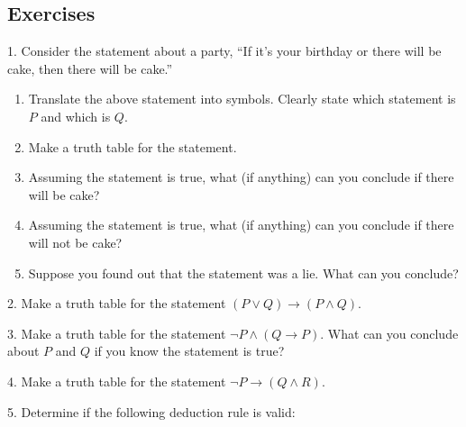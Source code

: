 \documentclass[10pt,]{book}
\theoremstyle{plain}
\theoremstyle{definition}
\theoremstyle{definition}
\theoremstyle{definition}
\numberwithin{equation}{chapter}
\def\imp{\rightarrow}
\begin{document}
\subsection[Exercises]{Exercises}\label{exercises-19}
\begin{exerciselist}
\item[1.]\hypertarget{exercise-220}{}
              Consider the statement about a party, ``If it's your birthday or there will be cake, then there will be cake.''
\leavevmode%
\begin{enumerate}[label=(\alph*)]
\item\hypertarget{li-1045}{}
                  Translate the above statement into symbols. Clearly state which statement is \(P\) and which is \(Q\).
\item\hypertarget{li-1046}{}
                  Make a truth table for the statement.
\item\hypertarget{li-1047}{}
                  Assuming the statement is true, what (if anything) can you conclude if there will be cake?
\item\hypertarget{li-1048}{}
                  Assuming the statement is true, what (if anything) can you conclude if there will not be cake?
\item\hypertarget{li-1049}{}
                  Suppose you found out that the statement was a lie. What can you conclude?
\end{enumerate}
\par\smallskip
\item[2.]\hypertarget{exercise-221}{}
              Make a truth table for the statement \((P \vee Q) \imp (P \wedge Q)\).
\par\smallskip
\item[3.]\hypertarget{exercise-222}{}
              Make a truth table for the statement \(\neg P \wedge (Q \imp P)\). What can you conclude about \(P\) and \(Q\) if you know the statement is true?
\par\smallskip
\item[4.]\hypertarget{exercise-223}{}
              Make a truth table for the statement \(\neg P \imp (Q \wedge R)\).
\par\smallskip
\item[5.]\hypertarget{exercise-224}{}
              Determine if the following deduction rule is valid:
\begin{tabular}{ll}

\end{tabular}
\end{exerciselist}
\end{document}
